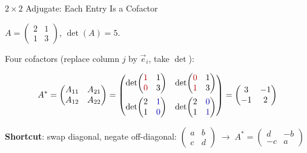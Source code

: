\documentclass[10pt]{beamer}
\theoremstyle{definition}
\newcommand{\x}[1]{\alert{\textbf{#1}}}
\newcommand{\rd}[1]{{\color{red!70!black}#1}}
\newcommand{\bl}[1]{{\color{blue!70!black}#1}}
\begin{document}
\begin{frame}{$2\times 2$ Adjugate: Each Entry Is a Cofactor}

$A = \begin{pmatrix} 2 & 1 \\ 1 & 3 \end{pmatrix}$, \quad $\det(A) = 5$.

\vfill

Four cofactors (replace column $j$ by $\vec e_i$, take $\det$):

$$A^* = \begin{pmatrix} A_{11} & A_{21} \\ A_{12} & A_{22} \end{pmatrix}
= \begin{pmatrix}
\det\!\begin{pmatrix}\rd{1}&1\\\rd{0}&3\end{pmatrix}
& \det\!\begin{pmatrix}\rd{0}&1\\\rd{1}&3\end{pmatrix} \\[10pt]
\det\!\begin{pmatrix}2&\bl{1}\\1&\bl{0}\end{pmatrix}
& \det\!\begin{pmatrix}2&\bl{0}\\1&\bl{1}\end{pmatrix}
\end{pmatrix}
= \begin{pmatrix} 3 & -1 \\ -1 & 2 \end{pmatrix}$$

\vfill

\x{Shortcut}: swap diagonal, negate off-diagonal:\;
$\begin{pmatrix}a&b\\c&d\end{pmatrix} \;\to\; A^* = \begin{pmatrix}d&-b\\-c&a\end{pmatrix}$

\end{frame}
\end{document}
